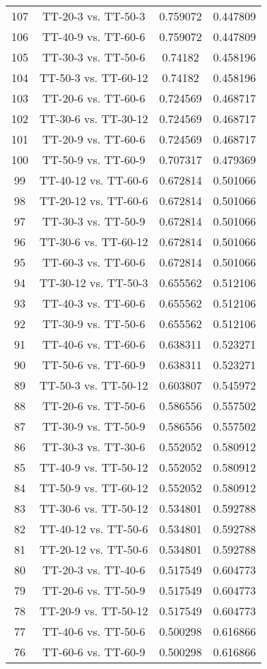 \documentclass[a4paper,10pt]{article}
\begin{document}
\begin{landscape}
\begin{table}[!htp]
\begin{tabular}{cccc}
107&TT-20-3 vs. TT-50-3&0.759072&0.447809\\
106&TT-40-9 vs. TT-60-6&0.759072&0.447809\\
105&TT-30-3 vs. TT-50-6&0.74182&0.458196\\
104&TT-50-3 vs. TT-60-12&0.74182&0.458196\\
103&TT-20-6 vs. TT-60-6&0.724569&0.468717\\
102&TT-30-6 vs. TT-30-12&0.724569&0.468717\\
101&TT-20-9 vs. TT-60-6&0.724569&0.468717\\
100&TT-50-9 vs. TT-60-9&0.707317&0.479369\\
99&TT-40-12 vs. TT-60-6&0.672814&0.501066\\
98&TT-20-12 vs. TT-60-6&0.672814&0.501066\\
97&TT-30-3 vs. TT-50-9&0.672814&0.501066\\
96&TT-30-6 vs. TT-60-12&0.672814&0.501066\\
95&TT-60-3 vs. TT-60-6&0.672814&0.501066\\
94&TT-30-12 vs. TT-50-3&0.655562&0.512106\\
93&TT-40-3 vs. TT-60-6&0.655562&0.512106\\
92&TT-30-9 vs. TT-50-6&0.655562&0.512106\\
91&TT-40-6 vs. TT-60-6&0.638311&0.523271\\
90&TT-50-6 vs. TT-60-9&0.638311&0.523271\\
89&TT-50-3 vs. TT-50-12&0.603807&0.545972\\
88&TT-20-6 vs. TT-50-6&0.586556&0.557502\\
87&TT-30-9 vs. TT-50-9&0.586556&0.557502\\
86&TT-30-3 vs. TT-30-6&0.552052&0.580912\\
85&TT-40-9 vs. TT-50-12&0.552052&0.580912\\
84&TT-50-9 vs. TT-60-12&0.552052&0.580912\\
83&TT-30-6 vs. TT-50-12&0.534801&0.592788\\
82&TT-40-12 vs. TT-50-6&0.534801&0.592788\\
81&TT-20-12 vs. TT-50-6&0.534801&0.592788\\
80&TT-20-3 vs. TT-40-6&0.517549&0.604773\\
79&TT-20-6 vs. TT-50-9&0.517549&0.604773\\
78&TT-20-9 vs. TT-50-12&0.517549&0.604773\\
77&TT-40-6 vs. TT-50-6&0.500298&0.616866\\
76&TT-60-6 vs. TT-60-9&0.500298&0.616866\\

\end{tabular}
\end{table}
\end{landscape}
\end{document}

